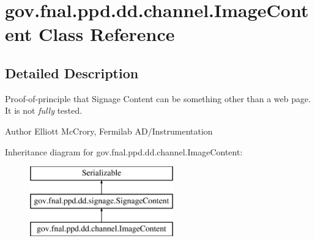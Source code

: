 \hypertarget{classgov_1_1fnal_1_1ppd_1_1dd_1_1channel_1_1ImageContent}{\section{gov.\-fnal.\-ppd.\-dd.\-channel.\-Image\-Content Class Reference}
\label{classgov_1_1fnal_1_1ppd_1_1dd_1_1channel_1_1ImageContent}
}


\subsection{Detailed Description}
Proof-\/of-\/principle that Signage Content can be something other than a web page. It is not {\itshape fully} tested.

\begin{DoxyAuthor}{Author}
Elliott Mc\-Crory, Fermilab A\-D/\-Instrumentation 
\end{DoxyAuthor}
Inheritance diagram for gov.\-fnal.\-ppd.\-dd.\-channel.\-Image\-Content\-:\begin{figure}[H]
\begin{center}
\leavevmode
\includegraphics[height=3.000000cm]{classgov_1_1fnal_1_1ppd_1_1dd_1_1channel_1_1ImageContent}
\end{center}
\end{figure}
